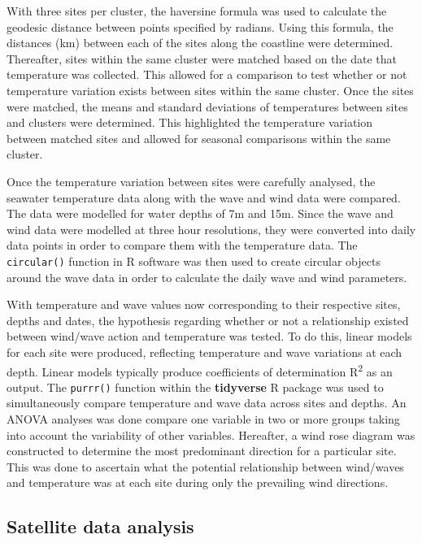 \documentclass[12pt,A4paper,]{article}
\begin{document}
With three sites per cluster, the haversine formula was used to
calculate the geodesic distance between points specified by radians.
Using this formula, the distances (km) between each of the sites along
the coastline were determined. Thereafter, sites within the same cluster
were matched based on the date that temperature was collected. This
allowed for a comparison to test whether or not temperature variation
exists between sites within the same cluster. Once the sites were
matched, the means and standard deviations of temperatures between sites
and clusters were determined. This highlighted the temperature variation
between matched sites and allowed for seasonal comparisons within the
same cluster.

Once the temperature variation between sites were carefully analysed,
the seawater temperature data along with the wave and wind data were
compared. The data were modelled for water depths of 7m and 15m. Since
the wave and wind data were modelled at three hour resolutions, they
were converted into daily data points in order to compare them with the
temperature data. The \texttt{circular()} function in R software was
then used to create circular objects around the wave data in order to
calculate the daily wave and wind parameters.

With temperature and wave values now corresponding to their respective
sites, depths and dates, the hypothesis regarding whether or not a
relationship existed between wind/wave action and temperature was
tested. To do this, linear models for each site were produced,
reflecting temperature and wave variations at each depth. Linear models
typically produce coefficients of determination R\textsuperscript{2} as
an output. The \texttt{purrr()} function within the \textbf{tidyverse} R
package was used to simultaneously compare temperature and wave data
across sites and depths. An ANOVA analyses was done compare one variable
in two or more groups taking into account the variability of other
variables. Hereafter, a wind rose diagram was constructed to determine
the most predominant direction for a particular site. This was done to
ascertain what the potential relationship between wind/waves and
temperature was at each site during only the prevailing wind directions.

\subsection{Satellite data analysis}\label{satellite-data-analysis}
\end{document}
